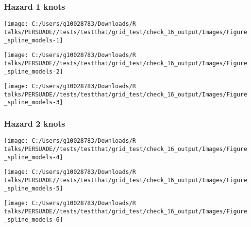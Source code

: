 \documentclass[
]{article}
\begin{document}
\clearpage

\clearpage

\subsubsection{Hazard 1 knots}\label{hazard-1-knots}

\begin{flushleft}\texttt{[image: C:/Users/g10028783/Downloads/R talks/PERSUADE//tests/testthat/grid\_test/check\_16\_output/Images/Figure\_spline\_models-1]} \end{flushleft}

\begin{flushleft}\texttt{[image: C:/Users/g10028783/Downloads/R talks/PERSUADE//tests/testthat/grid\_test/check\_16\_output/Images/Figure\_spline\_models-2]} \end{flushleft}

\begin{flushleft}\texttt{[image: C:/Users/g10028783/Downloads/R talks/PERSUADE//tests/testthat/grid\_test/check\_16\_output/Images/Figure\_spline\_models-3]} \end{flushleft}

\clearpage

\subsubsection{Hazard 2 knots}\label{hazard-2-knots}

\begin{flushleft}\texttt{[image: C:/Users/g10028783/Downloads/R talks/PERSUADE//tests/testthat/grid\_test/check\_16\_output/Images/Figure\_spline\_models-4]} \end{flushleft}

\begin{flushleft}\texttt{[image: C:/Users/g10028783/Downloads/R talks/PERSUADE//tests/testthat/grid\_test/check\_16\_output/Images/Figure\_spline\_models-5]} \end{flushleft}

\begin{flushleft}\texttt{[image: C:/Users/g10028783/Downloads/R talks/PERSUADE//tests/testthat/grid\_test/check\_16\_output/Images/Figure\_spline\_models-6]} \end{flushleft}

\clearpage
\end{document}
